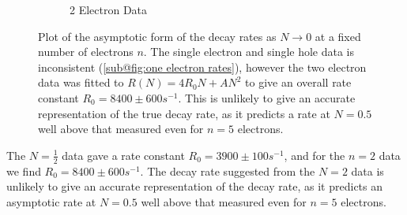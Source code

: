 \begin{figure}[htbp]
\begin{subfigure}{0.45\linewidth}
        \caption{2 Electron Data
        }\label{sub@fig:two electron rates}
    \end{subfigure}
    \caption{Plot of the asymptotic
        form of the decay rates as \(N\rightarrow{}0\)
        at a fixed number of electrons \(n\).
        The single electron and single
        hole data is inconsistent
        (\cref{sub@fig:one electron rates}),
        however the two electron data
        was fitted to \(R(N) = 4R_0N + AN^2\)
        to give an overall rate constant
        \(R_0 = 8400\pm 600s^{-1}\). This is
        unlikely to give an accurate
        representation of the
        true decay rate, as it predicts
        a rate at \(N=0.5\)
        well above that measured even
        for \(n=5\) electrons.
    }\label{fig:small N rate}
\end{figure}
The \(N=\frac{1}{2}\) data
gave a rate constant
\(R_0 = 3900\pm 100s^{-1}\),
and for the \(n=2\) data
we find \(R_0 = 8400\pm 600s^{-1}\).
The decay rate suggested
from the \(N=2\) data is
unlikely to give an accurate
representation of the
decay rate, as it predicts
an asymptotic rate at \(N=0.5\)
well above that measured even
for \(n=5\) electrons.

